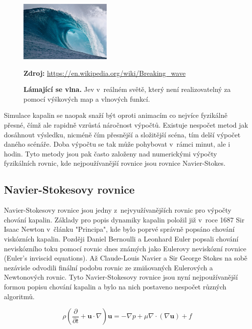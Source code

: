 \begin{figure}[hbt]
	\centering
	\captionsetup{justification=centering}
	\includegraphics[width=0.4\textwidth]{obrazky-figures/Large_breaking_wave.jpg}
	\caption{\textbf{Lámající se vlna.} Jev v~reálném světě, který není realizovatelný za pomocí výškových map a vlnových funkcí.}
	\textbf{Zdroj: } \url{https://en.wikipedia.org/wiki/Breaking_wave}
	\label{keepCalm}
\end{figure}

Simulace kapalin se naopak snaží být oproti animacím co nejvíce fyzikálně přesné, čímž ale rapidně vzrůstá náročnost výpočtů. Existuje nespočet metod jak dosáhnout výsledku, nicméně čím přesnější a složitější scéna, tím delší výpočet daného scénáře. Doba výpočtu se tak může pohybovat v~rámci minut, ale i hodin. Tyto metody jsou pak často založeny nad numerickými výpočty fyzikálních rovnic, kde nejpoužívanější rovnice jsou rovnice Navier-Stokes.

\subsection{Navier-Stokesovy rovnice}
Navier-Stokesovy rovnice jsou jedny z~nejvyužívanějších rovnic pro výpočty chování kapalin. Základy pro popis dynamiky kapalin položil již v~roce 1687 Sir Isaac Newton v~článku "Principa", kde bylo poprvé správně popsáno chování viskózních kapalin. Později Daniel Bernoulli a Leonhard Euler popsali chování neviskózního toku pomocí rovnic dnes známých jako Eulerovy neviskózní rovnice (Euler’s inviscid equations). Až Claude-Louis Navier a Sir George Stokes na sobě nezávisle odvodili finální podobu rovnic ze zmiňovaných Eulerových a Newtonových rovnic. Tyto Navier-Stokesovy rovnice jsou nyní nejpoužívanější formou popisu chování kapalin a bylo na nich postaveno nespočet různých algoritmů. \cite{simscale_2020}

\begin{equation}
	\rho(\frac{\partial}{\partial t} + \mathbf{u} \cdot \nabla)\mathbf{u} = -\nabla p + \mu\nabla\cdot(\nabla \mathbf{u}) + f 
	\label{eq:NavierStokes}
\end{equation}


